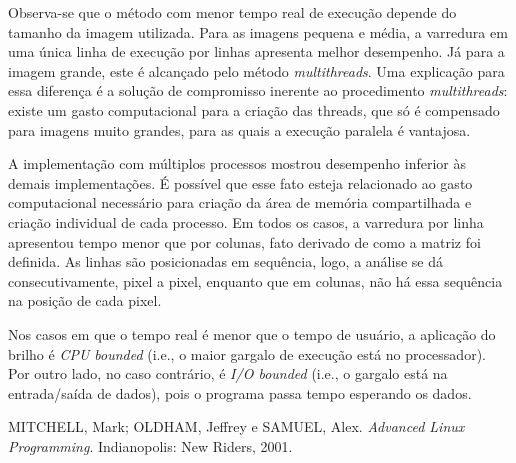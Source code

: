 \documentclass[a4paper, 10pt, conference]{ieeeconf}
\begin{document}
Observa-se que o método com menor tempo real de execução depende do tamanho da imagem utilizada. Para as imagens pequena e média, a varredura em uma única linha de execução por linhas apresenta melhor desempenho. Já para a imagem grande, este é alcançado pelo método \textit{multithreads}. Uma explicação para essa diferença é a solução de compromisso inerente ao procedimento \textit{multithreads}: existe um gasto computacional para a criação das threads, que só é compensado para imagens muito grandes, para as quais a execução paralela é vantajosa.

A implementação com múltiplos processos mostrou desempenho inferior às demais implementações. É possível que esse fato esteja relacionado ao gasto computacional necessário para criação da área de memória compartilhada e criação individual de cada processo. Em todos os casos, a varredura por linha apresentou tempo menor que por colunas, fato derivado de como a matriz foi definida. As linhas são posicionadas em sequência, logo, a análise se dá consecutivamente, pixel a pixel, enquanto que em colunas, não há essa sequência na posição de cada pixel.

Nos casos em que o tempo real é menor que o tempo de usuário, a aplicação do brilho é \textit{CPU bounded} (i.e., o maior gargalo de execução está no processador). Por outro lado, no caso contrário, é \textit{I/O bounded} (i.e., o gargalo está na entrada/saída de dados), pois o programa passa tempo esperando os dados.

\begin{thebibliography}{99}

 MITCHELL, Mark; OLDHAM, Jeffrey e SAMUEL, Alex. \textit{Advanced Linux Programming}. Indianopolis: New Riders, 2001.

\end{thebibliography}
\end{document}

